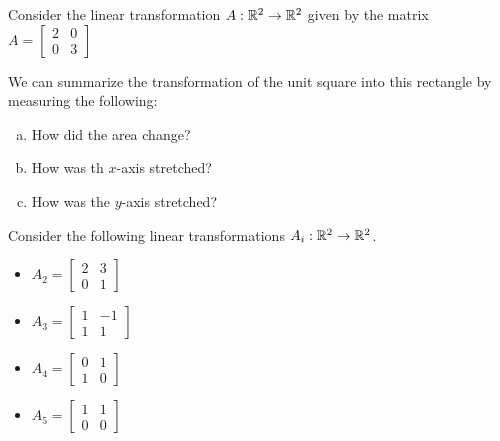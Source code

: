 
\begin{applicationActivities}{1}{25}

\begin{activity}{5}
Consider the linear transformation $A : \mathbb{R}^2 \rightarrow \mathbb{R}^2$ given by the matrix $A = \begin{bmatrix} 2 & 0 \\ 0 & 3 \end{bmatrix}$

\begin{center}
\end{center}

We can summarize the transformation of the unit square into this rectangle by measuring the following:

\begin{enumerate}[(a)]
\item How did the area change?
\item How was th $x$-axis stretched?
\item How was the $y$-axis stretched?
\end{enumerate}

\end{activity}


\begin{activity}{15}
Consider the following linear transformations  $A_i: \mathbb{R}^2 \rightarrow \mathbb{R}^2$.
\begin{itemize}
\item $A_2 = \begin{bmatrix} 2 & 3 \\ 0 & 1 \end{bmatrix}$
\item $A_3 = \begin{bmatrix} 1 & -1 \\ 1 & 1 \end{bmatrix}$
\item $A_4 = \begin{bmatrix} 0 & 1 \\ 1 & 0 \end{bmatrix}$
\item $A_5 = \begin{bmatrix} 1 & 1 \\ 0 & 0 \end{bmatrix}$
\end{itemize}


\end{activity}
\end{applicationActivities}
